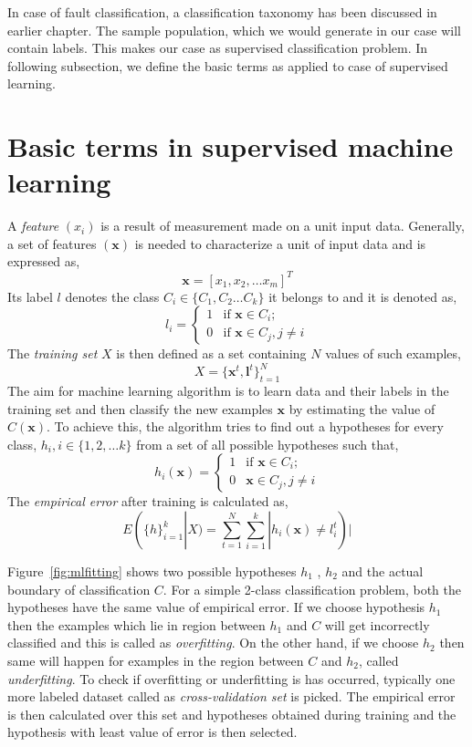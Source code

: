 In case of fault classification, a classification taxonomy has been discussed in earlier chapter. The sample population, which we would generate in our case will contain labels. This makes our case as supervised classification problem. In following subsection, we define the basic terms as applied to case of supervised learning.

\section{Basic terms in supervised machine learning}

A \emph{feature} $(x_i)$ is a result of measurement made on a unit input data. Generally, a set of features $(\boldsymbol{x})$ is needed to characterize a unit of input data and is expressed as,
\[ \boldsymbol{x} = \left[ x_1, x_2, \ldots x_m \right]^T \]  
Its label $l$ denotes the class $C_i \in \{C_1, C_2 \ldots C_k\}$ it belongs to and it is denoted as,
\[ l_i = \left\{ \begin{array}{ll}
         1 & \mbox{if $\boldsymbol{x} \in C_i$};\\
         0 & \mbox{if $\boldsymbol{x} \in C_j, j \neq i$}\end{array} \right. \] 
The \emph{training set} $X$ is then defined as a set containing $N$ values of such examples,
\[ X = \{\boldsymbol{x}^t , \boldsymbol{l}^t \}_{t=1}^N  \]
The aim for machine learning algorithm is to learn data and their labels in the training set and then classify the new examples $\boldsymbol{x}$ by estimating the value of $C(\boldsymbol{x})$. To achieve this, the algorithm tries to find out a hypotheses for every class, $h_i, i \in\{1,2, \ldots k\}$ from a set of all possible hypotheses such that,
\[ h_i(\boldsymbol{x}) = \left\{ \begin{array}{ll}
         1 & \mbox{if $\boldsymbol{x} \in C_i$};\\
         0 & \mbox{$\boldsymbol{x} \in C_j, j \neq i$}\end{array} \right. \] 
The \emph{empirical error} after training is calculated as,
\[ E(\{h\}_{i=1}^k|X) = \sum\limits_{t=1}^N \sum\limits_{i=1}^k | h_i(\boldsymbol{x}) \neq l_i^t ) | \]

Figure~\ref{fig:mlfitting} shows two possible hypotheses $h_1$ , $h_2$ and the actual boundary of classification $C$. For a simple 2-class classification problem, both the hypotheses have the same value of empirical error. If we choose hypothesis $h_1$ then the examples which lie in region between $h_1$ and $C$ will get incorrectly classified and this is called as \emph{overfitting}. On the other hand, if we choose $h_2$ then same will happen for examples in the region between $C$ and $h_2$, called \emph{underfitting}. To check if overfitting or underfitting is has occurred, typically one more labeled dataset called as \emph{cross-validation set} is picked. The empirical error is then calculated over this set and hypotheses obtained during training and the hypothesis with least value of error is then selected. 

